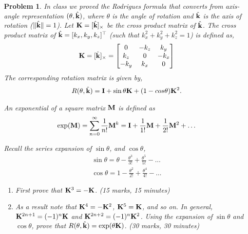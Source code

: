 \documentclass{article}
\newtheorem{prob}{Problem}
\newif\ifsol
\begin{document}
\begin{prob}
  In class we proved the Rodrigues formula that converts from axis-angle
  representation $(\theta, \hat{\mathbf{k}})$, where $\theta$ is the angle of rotation
  and $\hat{\mathbf{k}}$ is the axis of rotation ($\|\hat{\mathbf{k}}\| = 1$). Let $\mathbf{K} = [\hat{\mathbf{k}}]_{\times}$ be
  the cross product matrix of $\hat{\mathbf{k}}$. The cross product matrix
  of $\hat{\mathbf{k}} = [k_x, k_y, k_z]^\top$ (such that $k_x^2 + k_y^2 + k_z^2 = 1$) is defined as,
    \begin{align}
      \mathbf{K} = [\hat{\mathbf{k}}]_{\times} = \begin{bmatrix}
        0 & -k_z & k_y \\
        k_z & 0 & -k_x \\
        -k_y & k_x & 0
      \end{bmatrix}
    \end{align}
  The corresponding rotation matrix is
  given by,
  \begin{align}
    R(\theta, \hat{\mathbf{k}}) = \mathbf{I} + \sin \theta \mathbf{K} + (1-cos \theta) \mathbf{K}^2.
  \end{align}

  An exponential of a square matrix $\mathbf{M}$ is defined as
  \begin{align}
    \exp(\mathbf{M}) = \sum_{n=0}^\infty \frac{1}{n!} \mathbf{M}^k = \mathbf{I} + \frac{1}{1!}\mathbf{M} + \frac{1}{2!}\mathbf{M}^2 + \dots
  \end{align}

  Recall the series expansion of $\sin \theta$, and $\cos \theta$,
  \begin{align}
    \sin \theta = \theta - \frac{\theta^3}{3!} + \frac{\theta^5}{5!} - \dots
    \\
    \cos \theta = 1 - \frac{\theta^2}{2!} + \frac{\theta^4}{4!} - \dots
  \end{align}

  \begin{enumerate}
  \item First prove that $\mathbf{K}^3 = - \mathbf{K}$. (15 marks, 15 minutes)
  \item As a result note that $\mathbf{K}^4 = - \mathbf{K}^2$, $\mathbf{K}^5 = \mathbf{K}$, and so on.
    In general, $\mathbf{K}^{2n+1} =
    (-1)^n\mathbf{K}$ and $\mathbf{K}^{2n+2} = (-1)^n\mathbf{K}^2$. Using the expansion of $\sin\theta$ and $\cos\theta$, prove that
    $R(\theta, \hat{\mathbf{k}}) = \exp(\theta \mathbf{K})$. (30 marks, 30 minutes)
  \end{enumerate}
\end{prob}
\ifsol
\end{document}
